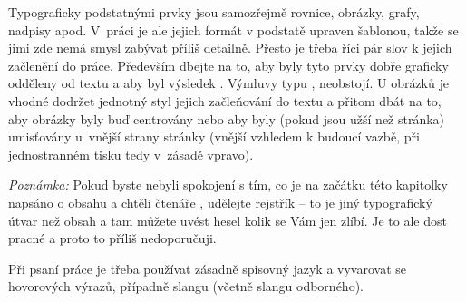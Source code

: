 Typograficky podstatnými prvky jsou samozřejmě rovnice, obrázky, grafy, nadpisy apod. V~práci je ale jejich formát v podstatě  upraven šablonou, takže se jimi zde nemá smysl zabývat příliš detailně. Přesto je třeba říci pár slov k jejich začlenění do práce. Především dbejte na to, aby byly
tyto  prvky dobře graficky odděleny od textu a aby byl výsledek . Výmluvy typu ,  neobstojí. U obrázků je vhodné dodržet jednotný styl jejich začleňování do textu a přitom dbát na to, aby obrázky byly buď centrovány nebo aby byly (pokud jsou užší než stránka) umisťovány u~vnější strany stránky (vnější vzhledem k budoucí vazbě, při jednostranném tisku tedy v~zásadě vpravo).

\textit{Poznámka:} Pokud byste nebyli spokojení s tím, co je na začátku této kapitolky napsáno o obsahu a chtěli čtenáře , udělejte rejstřík -- to je jiný typografický útvar než obsah a tam můžete uvést hesel kolik se Vám jen zlíbí. Je to ale dost pracné a proto to příliš nedoporučuji.
\rm

Při psaní práce je třeba používat zásadně spisovný jazyk a vyvarovat se hovorových výrazů, případně slangu (včetně slangu odborného).

